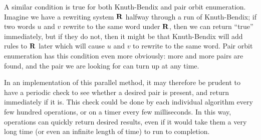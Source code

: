 A similar condition is true for both Knuth-Bendix and pair orbit enumeration.
Imagine we have a rewriting system $\mathbf{R}$ halfway through a run of Knuth-Bendix;
if two words $u$ and $v$ rewrite to the same word under $\mathbf{R}$, then we can
return ``true'' immediately, but if they do not, then it might be that
Knuth-Bendix will add rules to $\mathbf{R}$ later which will cause $u$ and $v$ to
rewrite to the same word.  Pair orbit enumeration has this condition even more
obviously: more and more pairs are found, and the pair we are looking for can
turn up at any time.

In an implementation of this parallel method, it may therefore be prudent to
have a periodic check to see whether a desired pair is present, and return
immediately if it is.  This check could be done by each individual algorithm
every few hundred operations, or on a timer every few milliseconds.  In this
way, operations can quickly return desired results, even if it would take them a
very long time (or even an infinite length of time) to run to completion.




